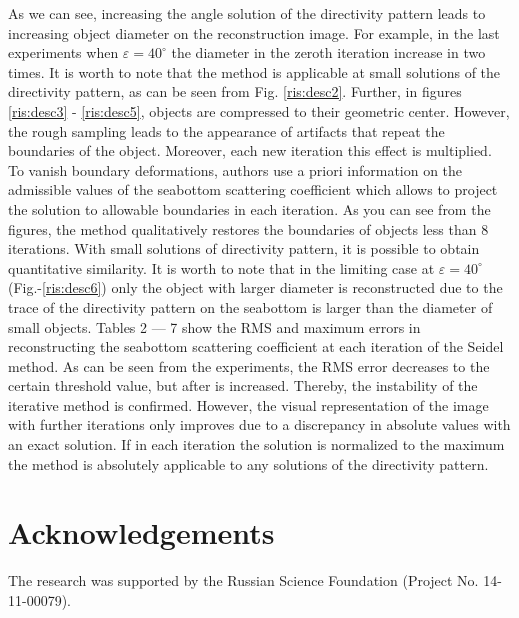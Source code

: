 \documentclass{procDDs}
\begin{document}
As we can see, increasing the angle solution of the directivity pattern leads to increasing object diameter on the reconstruction image. For example, in the last experiments when $\varepsilon=40^\circ$ the diameter in the zeroth iteration increase in two times. It is worth to note that the method is applicable at small solutions of the directivity pattern, as can be seen from Fig. \ref{ris:desc2}. Further, in figures \ref{ris:desc3} - \ref{ris:desc5}, objects are compressed to their geometric center. However, the rough sampling leads to the appearance of artifacts that repeat the boundaries of the object. Moreover, each new iteration this effect is multiplied. To vanish boundary deformations, authors use a priori information on the admissible values of the seabottom scattering coefficient which allows to project the solution to allowable boundaries in each iteration. As you can see from the figures, the method qualitatively restores the boundaries of objects less than 8 iterations. With small solutions of directivity pattern, it is possible to obtain quantitative similarity. It is worth to note that in the limiting case at $\varepsilon = 40^\circ$ (Fig.-\ref{ris:desc6}) only the object with larger diameter is reconstructed due to the trace of the directivity pattern on the seabottom is larger than the diameter of small objects. Tables 2 --- 7 show the RMS and maximum errors in reconstructing the seabottom scattering coefficient at each iteration of the Seidel method. As can be seen from the experiments, the RMS error decreases to the certain threshold value, but after is increased. Thereby, the instability of the iterative method is confirmed. However, the visual representation of the image with further iterations only improves due to a discrepancy in absolute values with an exact solution. If in each iteration the solution is normalized to the maximum the method is absolutely applicable to any solutions of the directivity pattern.

\section*{Acknowledgements}
The research was supported by the Russian Science Foundation (Project No. 14-11-00079).

\end{document}
